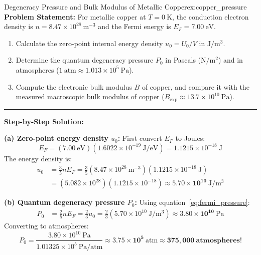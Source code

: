 \documentclass[11pt,a4paper]{article}
\begin{document}
\begin{examplebox}{Degeneracy Pressure and Bulk Modulus of Metallic Copper}{ex:copper_pressure}
\textbf{Problem Statement:}
For metallic copper at $T = 0\ \mathrm{K}$, the conduction electron density is $n = 8.47 \times 10^{28}\ \mathrm{m}^{-3}$ and the Fermi energy is $E_F = 7.00\ \mathrm{eV}$.
\begin{enumerate}[label=(\alph*)]
    \item Calculate the zero-point internal energy density $u_0 = U_0/V$ in $\mathrm{J/m^3}$.
    \item Determine the quantum degeneracy pressure $P_0$ in Pascals ($\mathrm{N/m^2}$) and in atmospheres ($1\ \mathrm{atm} \approx 1.013 \times 10^5\ \mathrm{Pa}$).
    \item Compute the electronic bulk modulus $B$ of copper, and compare it with the measured macroscopic bulk modulus of copper ($B_{\mathrm{exp}} \approx 13.7 \times 10^{10}\ \mathrm{Pa}$).
\end{enumerate}

\vspace{0.2cm}\hrule\vspace{0.2cm}
\textbf{Step-by-Step Solution:}

\textbf{(a) Zero-point energy density $u_0$:}
First convert $E_F$ to Joules:
\[
E_F = (7.00\ \mathrm{eV})(1.6022 \times 10^{-19}\ \mathrm{J/eV}) = 1.1215 \times 10^{-18}\ \mathrm{J}
\]
The energy density is:
\begin{align*}
u_0 &= \frac{3}{5}n E_F = \frac{3}{5}(8.47 \times 10^{28}\ \mathrm{m^{-3}})(1.1215 \times 10^{-18}\ \mathrm{J}) \\
&= (5.082 \times 10^{28})(1.1215 \times 10^{-18}) \approx \mathbf{5.70 \times 10^{10}\ \mathrm{J/m^3}}
\end{align*}

\textbf{(b) Quantum degeneracy pressure $P_0$:}
Using equation~\eqref{eq:fermi_pressure}:
\begin{align*}
P_0 &= \frac{2}{5}n E_F = \frac{2}{3}u_0 = \frac{2}{3}(5.70 \times 10^{10}\ \mathrm{J/m^3}) \approx \mathbf{3.80 \times 10^{10}\ \mathrm{Pa}}
\end{align*}
Converting to atmospheres:
\[
P_0 = \frac{3.80 \times 10^{10}\ \mathrm{Pa}}{1.01325 \times 10^5\ \mathrm{Pa/atm}} \approx \mathbf{3.75 \times 10^5\ \mathrm{atm}} \approx \mathbf{375{,}000\ \text{atmospheres}!}
\]


\end{examplebox}
\end{document}
